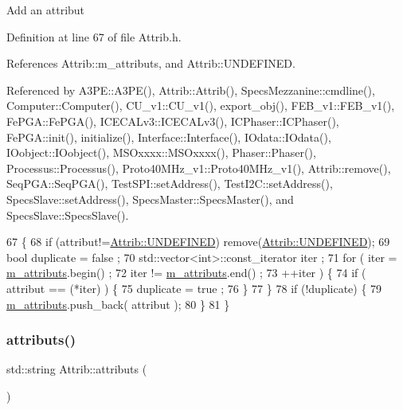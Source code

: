 Add an attribut 

Definition at line 67 of file Attrib.\+h.



References Attrib\+::m\+\_\+attributs, and Attrib\+::\+U\+N\+D\+E\+F\+I\+N\+ED.



Referenced by A3\+P\+E\+::\+A3\+P\+E(), Attrib\+::\+Attrib(), Specs\+Mezzanine\+::cmdline(), Computer\+::\+Computer(), C\+U\+\_\+v1\+::\+C\+U\+\_\+v1(), export\+\_\+obj(), F\+E\+B\+\_\+v1\+::\+F\+E\+B\+\_\+v1(), Fe\+P\+G\+A\+::\+Fe\+P\+G\+A(), I\+C\+E\+C\+A\+Lv3\+::\+I\+C\+E\+C\+A\+Lv3(), I\+C\+Phaser\+::\+I\+C\+Phaser(), Fe\+P\+G\+A\+::init(), initialize(), Interface\+::\+Interface(), I\+Odata\+::\+I\+Odata(), I\+Oobject\+::\+I\+Oobject(), M\+S\+Oxxxx\+::\+M\+S\+Oxxxx(), Phaser\+::\+Phaser(), Processus\+::\+Processus(), Proto40\+M\+Hz\+\_\+v1\+::\+Proto40\+M\+Hz\+\_\+v1(), Attrib\+::remove(), Seq\+P\+G\+A\+::\+Seq\+P\+G\+A(), Test\+S\+P\+I\+::set\+Address(), Test\+I2\+C\+::set\+Address(), Specs\+Slave\+::set\+Address(), Specs\+Master\+::\+Specs\+Master(), and Specs\+Slave\+::\+Specs\+Slave().


\begin{DoxyCode}
67                             \{
68     \textcolor{keywordflow}{if} (attribut!=\hyperlink{classAttrib_a69e171d7cc6417835a5a306d3c764235a3a8da2ab97dda18aebab196fe4100531}{Attrib::UNDEFINED}) \textcolor{keyword}{remove}(\hyperlink{classAttrib_a69e171d7cc6417835a5a306d3c764235a3a8da2ab97dda18aebab196fe4100531}{Attrib::UNDEFINED});
69     \textcolor{keywordtype}{bool} duplicate = false ;
70     std::vector<int>::const\_iterator iter ;
71     \textcolor{keywordflow}{for} ( iter  = \hyperlink{classAttrib_ac4bd58a0cc6b38a3b711d609a3d3aacc}{m\_attributs}.begin() ;
72           iter != \hyperlink{classAttrib_ac4bd58a0cc6b38a3b711d609a3d3aacc}{m\_attributs}.end()   ;
73           ++iter ) \{
74       \textcolor{keywordflow}{if} ( attribut == (*iter) ) \{
75         duplicate = true ;
76       \}
77     \}
78     \textcolor{keywordflow}{if} (!duplicate) \{
79       \hyperlink{classAttrib_ac4bd58a0cc6b38a3b711d609a3d3aacc}{m\_attributs}.push\_back( attribut );
80     \}
81   \}
\end{DoxyCode}
\mbox{\label{classAttrib_aee7bbf16b144887f196e1341b24f8a26}} 
\subsubsection{\texorpdfstring{attributs()}{attributs()}}
{\footnotesize\ttfamily std\+::string Attrib\+::attributs (\begin{DoxyParamCaption}{ }\end{DoxyParamCaption})\hspace{0.3cm}{\ttfamily [inherited]}}

